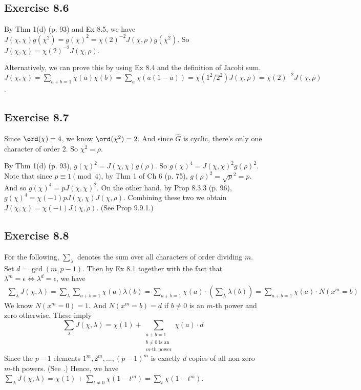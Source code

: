 \documentclass[../Chapter.tex]{subfiles}
\begin{document}
\subsection*{Exercise 8.6}

By Thm 1(d) (p. 93) and Ex 8.5, we have $J(\chi,\chi)g(\chi^2)=g(\chi)^2=\chi(2)^{-2}J(\chi,\rho)g(\chi^2)$. So $J(\chi,\chi)=\chi(2)^{-2}J(\chi,\rho)$.

Alternatively, we can prove this by using Ex 8.4 and the definition of Jacobi sum. $J(\chi,\chi) = \sum_{a+b=1} \chi(a)\chi(b) = \sum_a \chi(a(1-a)) = \chi(1^2/2^2)J(\chi,\rho) = \chi(2)^{-2}J(\chi,\rho)$.

\subsection*{Exercise 8.7}

Since $\ord(\chi)=4$, we know $\ord(\chi^2)=2$. And since $\hat{G}$ is cyclic, there's only one character of order $2$. So $\chi^2=\rho$.

By Thm 1(d) (p. 93), $g(\chi)^2=J(\chi,\chi)g(\rho)$. So $g(\chi)^4=J(\chi,\chi)^2g(\rho)^2$. Note that since $p\equiv1\pmod{4}$, by Thm 1 of Ch 6 (p. 75), $g(\rho)^2=\sqrt{p}^2=p$. And so $g(\chi)^4=pJ(\chi,\chi)^2$. On the other hand, by Prop 8.3.3 (p. 96), $g(\chi)^4=\chi(-1)pJ(\chi,\chi)J(\chi,\rho)$. Combining these two we obtain $J(\chi,\chi)=\chi(-1)J(\chi,\rho)$. (See Prop 9.9.1.)

\subsection*{Exercise 8.8}

For the following, $\sum_\lambda$ denotes the sum over all characters of order dividing $m$. Set $d=\gcd(m,p-1)$. Then by Ex 8.1 together with the fact that $\lambda^m=\epsilon \iff \lambda^d=\epsilon$, we have
\begin{align*}
\sum_\lambda J(\chi,\lambda) = \sum_\lambda \sum_{a+b=1} \chi(a)\lambda(b) = \sum_{a+b=1} \chi(a)\cdot\left(\sum_\lambda \lambda(b)\right) = \sum_{a+b=1}\chi(a)\cdot N(x^m=b)
\end{align*}
We know $N(x^m=0)=1$. And $N(x^m=b)=d$ if $b\neq0$ is an $m$-th power and zero otherwise. These imply $$\sum_\lambda J(\chi,\lambda) = \chi(1) + \sum_{\substack{a+b=1\\ b\neq0 \text{ is an } \\ m\text{-th power}}} \chi(a)\cdot d$$
Since the $p-1$ elements $1^m,2^m,\ldots,(p-1)^m$ is exactly $d$ copies of all non-zero $m$-th powers. (See .) Hence, we have $\sum_\lambda J(\chi,\lambda) = \chi(1) + \sum_{t\neq0} \chi(1-t^m) = \sum_t \chi(1-t^m)$.
\end{document}
